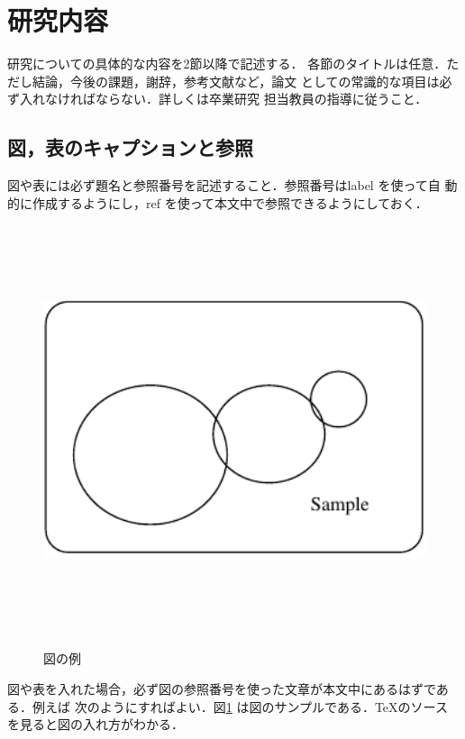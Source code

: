 \section{研究内容}\label{sec2}
研究についての具体的な内容を2節以降で記述する．
各節のタイトルは任意．ただし結論，今後の課題，謝辞，参考文献など，論文
としての常識的な項目は必ず入れなければならない．詳しくは卒業研究
担当教員の指導に従うこと．


\subsection{図，表のキャプションと参照}

図や表には必ず題名と参照番号を記述すること．参照番号はlabel を使って自
動的に作成するようにし，ref を使って本文中で参照できるようにしておく．

\begin{figure}[htbp]
  \begin{center}
     \includegraphics[width=13cm,height=12cm,keepaspectratio]{figure.pdf}\\
  \end{center}
  \caption{図の例}%
\label{fig1}
\end{figure}

図や表を入れた場合，必ず図の参照番号を使った文章が本文中にあるはずである．例えば
次のようにすればよい．図\ref{fig1} は図のサンプルである．\TeX のソース
を見ると図の入れ方がわかる．

